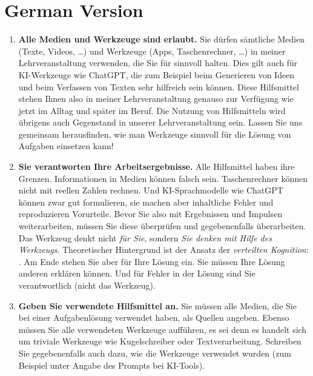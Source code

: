 \documentclass{../cssheet}
\begin{document}
\newpage
\pagestyle{docstyle}

\section{German Version}

\begin{enumerate}
\item \textbf{Alle Medien und Werkzeuge sind erlaubt.} Sie dürfen sämtliche Medien (Texte, Videos, \ldots) und Werkzeuge (Apps, Taschenrechner, \ldots) in meiner Lehrveranstaltung verwenden, die Sie für sinnvoll halten. Dies gilt auch für KI-Werkzeuge wie ChatGPT, die zum Beispiel beim Generieren von Ideen und beim Verfassen von Texten sehr hilfreich sein können. Diese Hilfsmittel stehen Ihnen also in meiner Lehrveranstaltung genauso zur Verfügung wie jetzt im Alltag und später im Beruf. Die Nutzung von Hilfsmitteln wird übrigens auch Gegenstand in unserer Lehrveranstaltung sein. Lassen Sie uns gemeinsam herausfinden, wie man Werkzeuge sinnvoll für die Lösung von Aufgaben einsetzen kann! 
\item \textbf{Sie verantworten Ihre Arbeitsergebnisse.} Alle Hilfsmittel haben ihre Grenzen. Informationen in Medien können falsch sein. Taschenrechner können nicht mit reellen Zahlen rechnen. Und KI-Sprachmodelle wie ChatGPT können zwar gut formulieren, sie machen aber inhaltliche Fehler und reproduzieren Vorurteile. Bevor Sie also mit Ergebnissen und Impulsen weiterarbeiten, müssen Sie diese überprüfen und gegebenenfalls überarbeiten. Das Werkzeug denkt nicht \emph{für Sie}, sondern \emph{Sie denken mit Hilfe des Werkzeugs}. Theoretischer Hintergrund ist der Ansatz der \emph{verteilten Kognition}: . Am Ende stehen Sie aber für Ihre Lösung ein. Sie müssen Ihre Lösung anderen erklären können. Und für Fehler in der Lösung sind Sie verantwortlich (nicht das Werkzeug). 
\item \textbf{Geben Sie verwendete Hilfsmittel an.} Sie müssen alle Medien, die Sie bei einer Aufgabenlösung verwendet haben, als Quellen angeben. Ebenso müssen Sie alle verwendeten Werkzeuge aufführen, es sei denn es handelt sich um triviale Werkzeuge wie Kugelschreiber oder Textverarbeitung. Schreiben Sie gegebenenfalls auch dazu, wie die Werkzeuge verwendet wurden (zum Beispiel unter Angabe des Prompts bei KI-Tools).

\end{enumerate}
\end{document}
